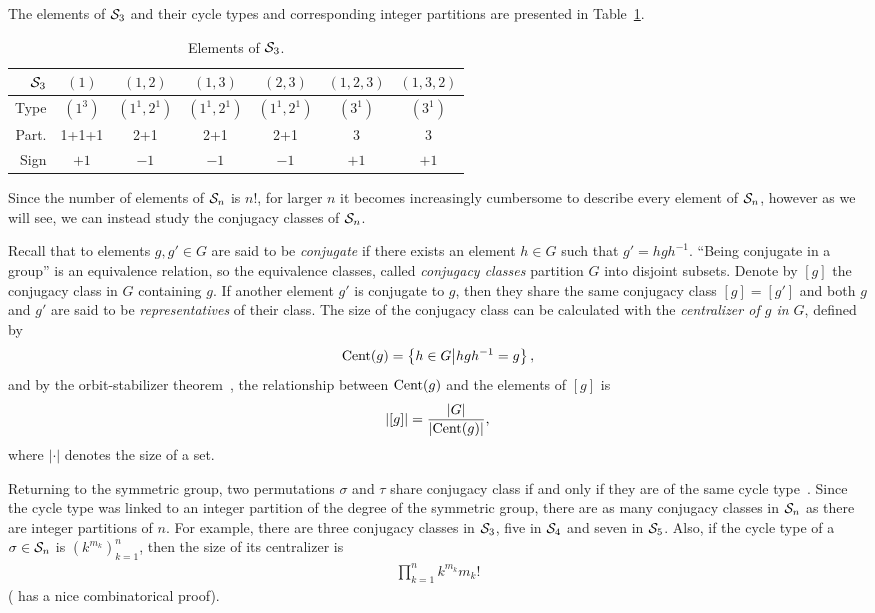 \begin{example}[$\Sym_3$]
	The elements of $\Sym_3$ and their cycle types and corresponding integer partitions are presented in Table~\ref{table:elementsSym3}.
\end{example}

\begin{table}[hbt!]
	\centering
	\begin{tabular}{r | c c c c c c }
		$\Sym_3$ & $(1)$   & $(1,2)$     & $(1,3)$     & $(2,3)$     & $(1,2,3)$ & $(1,3,2)$ \\ \hline
		    Type & $(1^3)$ & $(1^1,2^1)$ & $(1^1,2^1)$ & $(1^1,2^1)$ & $(3^1)$   & $(3^1)$   \\
		   Part. & 1+1+1   & 2+1         & 2+1         & 2+1         & 3         & 3         \\
		   Sign  & $+1$    & $-1$        & $-1$        & $-1$        & $+1$      & $+1$
	\end{tabular}
	\caption{Elements of $\Sym_3$.}
	\label{table:elementsSym3}
\end{table}

Since the number of elements of $\mathcal{S}_n$ is $n!$, for larger $n$ it becomes increasingly cumbersome to describe every element of $\mathcal{S}_n$, however as we will see, we can instead study the conjugacy classes of $\mathcal{S}_n$.

Recall that to elements $g, g' \in G$ are said to be \textit{conjugate} if there exists an element $h \in G$ such that $g' = hgh^{-1}$. ``Being conjugate in a group'' is an equivalence relation, so the equivalence classes, called \textit{conjugacy classes} partition $G$ into disjoint subsets. Denote by $[g]$ the conjugacy class in $G$ containing $g$. If another element $g'$ is conjugate to $g$, then they share the same conjugacy class $[g] = [g']$ and both $g$ and $g'$ are said to be \textit{representatives} of their class. The size of the conjugacy class can be calculated with the \textit{centralizer of $g$ in $G$}, defined by
\begin{align*}
	\text{Cent}(g) = \left\lbrace h \in G \middle\vert hgh^{-1} = g \right\rbrace,
\end{align*}
and by the orbit-stabilizer theorem~\cite[Thm.21.3]{Biggs}, the relationship between $\text{Cent}(g)$ and the elements of $[g]$ is 
\begin{align*}
	|[g]| = \frac{|G|}{|\text{Cent}(g)|},
\end{align*}
where $| \cdot |$ denotes the size of a set.

Returning to the symmetric group, two permutations $\sigma$ and $\tau$ share conjugacy class if and only if they are of the same cycle type~\cite[Sect.1.1.]{Sagan}. Since the cycle type was linked to an integer partition of the degree of the symmetric group, there are as many conjugacy classes in $\mathcal{S}_n$ as there are integer partitions of $n$. For example, there are three conjugacy classes in $\Sym_3$, five in $\mathcal{S}_4$ and seven in $\mathcal{S}_5$. Also, if the cycle type of a $\sigma \in \mathcal{S}_n$ is $(k^{m_k})_{k=1}^n$, then the size of its centralizer is 
\begin{align*}
	\prod_{k=1}^{n} k^{m_k} m_k!
\end{align*}
(\cite[Prop.1.1.1.]{Sagan} has a nice combinatorical proof).

